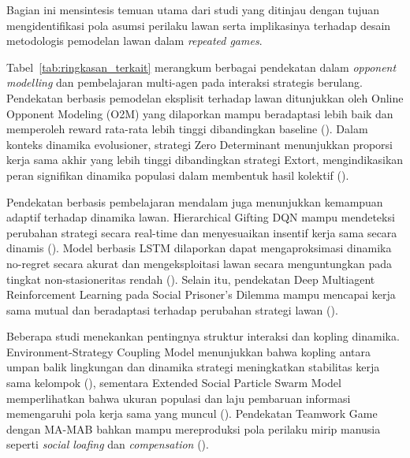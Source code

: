 Bagian ini mensintesis temuan utama dari studi yang ditinjau dengan tujuan mengidentifikasi pola asumsi perilaku lawan serta implikasinya terhadap desain metodologis pemodelan lawan dalam \textit{repeated games}. 

Tabel~\ref{tab:ringkasan_terkait} merangkum berbagai pendekatan dalam \textit{opponent modelling} dan pembelajaran multi-agen pada interaksi strategis berulang. Pendekatan berbasis pemodelan eksplisit terhadap lawan ditunjukkan oleh Online Opponent Modeling (O2M) yang dilaporkan mampu beradaptasi lebih baik dan memperoleh reward rata-rata lebih tinggi dibandingkan baseline (\cite{qiao_o2m_2024}). Dalam konteks dinamika evolusioner, strategi Zero Determinant menunjukkan proporsi kerja sama akhir yang lebih tinggi dibandingkan strategi Extort, mengindikasikan peran signifikan dinamika populasi dalam membentuk hasil kolektif (\cite{zhu_evolutionary_2025}).

Pendekatan berbasis pembelajaran mendalam juga menunjukkan kemampuan adaptif terhadap dinamika lawan. Hierarchical Gifting DQN mampu mendeteksi perubahan strategi secara real-time dan menyesuaikan insentif kerja sama secara dinamis (\cite{lv_inducing_2023}). Model berbasis LSTM dilaporkan dapat mengaproksimasi dinamika no-regret secara akurat dan mengeksploitasi lawan secara menguntungkan pada tingkat non-stasioneritas rendah (\cite{li_exploiting_2025}). Selain itu, pendekatan Deep Multiagent Reinforcement Learning pada Social Prisoner's Dilemma mampu mencapai kerja sama mutual dan beradaptasi terhadap perubahan strategi lawan (\cite{wang_achieving_2019}).

Beberapa studi menekankan pentingnya struktur interaksi dan kopling dinamika. Environment-Strategy Coupling Model menunjukkan bahwa kopling antara umpan balik lingkungan dan dinamika strategi meningkatkan stabilitas kerja sama kelompok (\cite{di_coupling_2023}), sementara Extended Social Particle Swarm Model memperlihatkan bahwa ukuran populasi dan laju pembaruan informasi memengaruhi pola kerja sama yang muncul (\cite{elhamer_effects_2020}). Pendekatan Teamwork Game dengan MA-MAB bahkan mampu mereproduksi pola perilaku mirip manusia seperti \textit{social loafing} dan \textit{compensation} (\cite{gomez_grounded_2025}).

